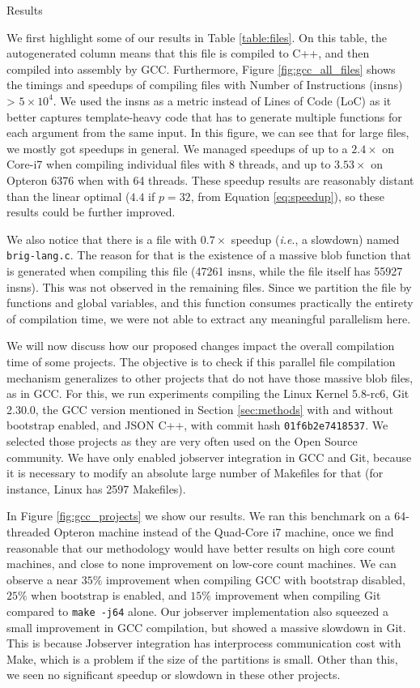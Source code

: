 \begin{subsection}{Results}\label{sec:lto-results}

We first highlight some of our results in Table \ref{table:files}. On this
table, the autogenerated column means that this file is compiled to C++, and
then compiled into assembly by GCC. Furthermore, Figure
\ref{fig:gcc_all_files} shows the timings and speedups of compiling files with
Number of Instructions (insns) > $5\times 10^4$. We used the insns as a metric
instead of Lines of Code (LoC) as it better captures template-heavy code that
has to generate multiple functions for each argument from
the same input. In this figure, we can see that for large files, we mostly got
speedups in general. We managed speedups of up to a $2.4\times$ on Core-i7 when
compiling individual files with 8 threads, and up to $3.53\times$ on Opteron
6376 when with 64 threads. These speedup results are reasonably distant than
the linear optimal ($4.4$ if $p = 32$, from Equation \ref{eq:speedup}), so these results could be further improved.

We also notice that there is a file with $0.7\times$ speedup (\textit{i.e}., a
slowdown) named \texttt{brig-lang.c}. The reason for that is the existence of a
massive blob function that is generated when compiling this file (47261 insns,
while the file itself has 55927 insns).  This was not observed in the remaining
files. Since we partition the file by functions and global variables, and this
function consumes practically the entirety of compilation time, we were not
able to extract any meaningful parallelism here.


We will now discuss how our proposed changes impact the overall compilation
time of some projects. The objective is to check if this parallel file
compilation mechanism generalizes to other projects that do not have those
massive blob files, as in GCC.  For this, we run experiments compiling the
Linux Kernel 5.8-rc6, Git 2.30.0, the GCC version mentioned in Section
\ref{sec:methods} with and without bootstrap enabled, and JSON C++, with commit
hash \texttt{01f6b2e7418537}. We selected those projects as they are very often
used on the Open Source community.  We have only enabled jobserver integration
in GCC and Git, because it is necessary to modify an absolute large number of
Makefiles for that (for instance, Linux has 2597 Makefiles).

In Figure \ref{fig:gcc_projects} we show our results. We ran this benchmark on a
64-threaded Opteron machine instead of the Quad-Core i7 machine, once we find
reasonable that our methodology would have better results on high core count
machines, and close to none improvement on low-core count machines.  We can
observe a near $35\%$ improvement when compiling GCC with bootstrap disabled,
$25\%$ when bootstrap is enabled, and $15\%$ improvement when compiling Git
compared to \texttt{make -j64} alone. Our jobserver implementation also
squeezed a small improvement in GCC compilation, but showed a massive slowdown
in Git. This is because Jobserver integration has interprocess communication
cost with Make, which is a problem if the size of the partitions is small.
Other than this, we seen no significant speedup or slowdown in these
other projects.


\end{subsection}
